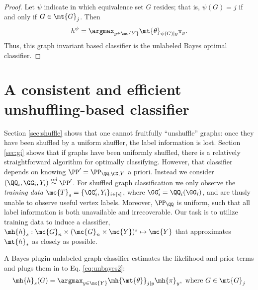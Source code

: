 \documentclass[10pt,journal,cspaper,compsoc]{IEEEtran}
\begin{document}
\begin{proof}
Let $\psi$ indicate in which equivalence set $G$ resides; that is,  $\psi(G)=j$ if and only if $G \in \mt{G}_j$.  Then
\begin{align}
	h^{\psi}= \argmax_{y \in \mc{Y}} \mt{\theta}_{\psi(G)|y} \pi_y.
\end{align}
Thus, this graph invariant based classifier is the unlabeled Bayes optimal classifier.
\end{proof}



\section{A consistent and efficient unshuffling-based classifier} %
\label{sec:bayes_optimal_graph_invariant_based_classifier}


Section \ref{sec:shuffle} shows that one cannot fruitfully ``unshuffle'' graphs: once they have been shuffled by a uniform shuffler, the label information is lost.  Section \ref{sec:gi} shows that if graphs have been uniformly shuffled, there is a relatively straightforward algorithm for optimally classifying. However, that classifier depends on knowing $\PP'=\PP_{\QQ,\GG,Y}$ a priori. Instead we consider  $(\QQ_i,\GG_i,Y_i)\overset{iid}{\sim}\PP'$.  For shuffled graph classification we only observe the \emph{training data} $\mc{T}_s=\{\GG_i',Y_i\}_{i \in [s]}$, where $\GG_i'=\QQ_i(\GG_i)$, and are thusly unable to observe useful vertex labels.  Moreover, $\PP_{\QQ}$ is uniform, such that all label information is both unavailable and irrecoverable.  Our task is to utilize training data to induce a classifier, $\mh{h}_s: \mc{G}_n \times (\mc{G}_n \times \mc{Y})^s \mapsto \mc{Y}$ that approximates $\mt{h}_*$ as closely as possible.  

A Bayes plugin unlabeled graph-classifier estimates the likelihood and prior terms and plugs them in to Eq. \eqref{eq:unbayes2}:
\begin{align} \label{eq:class}
	\mh{h}_s(G)=\argmax_{y\in\mc{Y}} \mh{\mt{\theta}}_{j|y}\mh{\pi}_y, \text{ where } G\in \mt{G}_j
\end{align}
\end{document}
